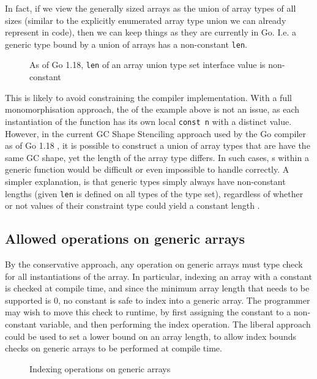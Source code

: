 In fact, if we view the generally sized arrays as the union of array types of
all sizes (similar to the explicitly enumerated array type union we can already
represent in code), then we can keep things as they are currently in Go. I.e. a
generic type bound by a union of arrays has a non-constant \texttt{len}.

\begin{figure}
    \caption{As of Go 1.18, \texttt{len} of an array union type set interface
        value is non-constant}
\end{figure}

This is likely to avoid constraining the compiler implementation. With a full
monomorphisation approach, the  of the example above is not an issue,
as each instantiation of the function has its own local \texttt{const n} with a
distinct value. However, in the current GC Shape Stenciling approach used by the
Go compiler as of Go 1.18 \autocite{generics1.18}, it is possible to construct a
union of array types that are have the same GC shape, yet the length of the
array type differs. In such cases, s within a generic function would
be difficult or even impossible to handle correctly. A simpler explanation, is
that generic types simply always have non-constant lengths (given \texttt{len}
is defined on all types of the type set), regardless of whether or not values of
their constraint type could yield a constant length \autocite{spec}.

\subsection{Allowed operations on generic arrays}

By the conservative approach, any operation on generic arrays must type check
for all instantiations of the array. In particular, indexing an array with a
constant is checked at compile time, and since the minimum array length that
needs to be supported is 0, no constant is safe to index into a generic array.
The programmer may wish to move this check to runtime, by first assigning the
constant to a non-constant  variable, and then performing the index
operation. The liberal approach could be used to set a lower bound on an array
length, to allow index bounds checks on generic arrays to be performed at
compile time.

\begin{figure}
    \caption{Indexing operations on generic arrays}
\end{figure}

